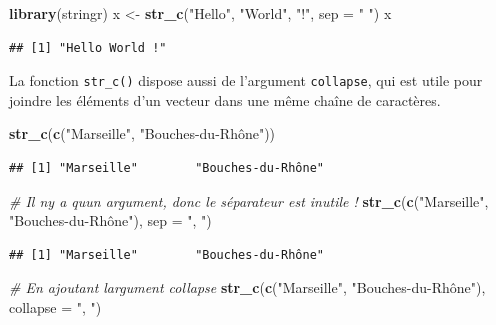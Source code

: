 \documentclass[
  11pt,
]{book}
\newenvironment{Shaded}{\begin{snugshade}}{\end{snugshade}}
\newcommand{\CommentTok}[1]{\textcolor[rgb]{0.56,0.35,0.01}{\textit{#1}}}
\newcommand{\DataTypeTok}[1]{\textcolor[rgb]{0.13,0.29,0.53}{#1}}
\newcommand{\KeywordTok}[1]{\textcolor[rgb]{0.13,0.29,0.53}{\textbf{#1}}}
\newcommand{\NormalTok}[1]{#1}
\newcommand{\StringTok}[1]{\textcolor[rgb]{0.31,0.60,0.02}{#1}}
\numberwithin{equation}{section}
\numberwithin{countremarque}{section}
\begin{document}
\begin{Shaded}
\begin{Highlighting}[]
\KeywordTok{library}\NormalTok{(stringr)}
\NormalTok{x \textless{}{-}}\StringTok{ }\KeywordTok{str\_c}\NormalTok{(}\StringTok{"Hello"}\NormalTok{, }\StringTok{"World"}\NormalTok{, }\StringTok{"!"}\NormalTok{, }\DataTypeTok{sep =} \StringTok{" "}\NormalTok{)}
\NormalTok{x}
\end{Highlighting}
\end{Shaded}

\begin{lstlisting}
## [1] "Hello World !"
\end{lstlisting}

La fonction \texttt{str\_c()} dispose aussi de l'argument \texttt{collapse}, qui est utile pour joindre les éléments d'un vecteur dans une même chaîne de caractères.

\begin{Shaded}
\begin{Highlighting}[]
\KeywordTok{str\_c}\NormalTok{(}\KeywordTok{c}\NormalTok{(}\StringTok{"Marseille"}\NormalTok{, }\StringTok{"Bouches{-}du{-}Rhône"}\NormalTok{))}
\end{Highlighting}
\end{Shaded}

\begin{lstlisting}
## [1] "Marseille"        "Bouches-du-Rhône"
\end{lstlisting}

\begin{Shaded}
\begin{Highlighting}[]
\CommentTok{\# Il n\textquotesingle{}y a qu\textquotesingle{}un argument, donc le séparateur est inutile !}
\KeywordTok{str\_c}\NormalTok{(}\KeywordTok{c}\NormalTok{(}\StringTok{"Marseille"}\NormalTok{, }\StringTok{"Bouches{-}du{-}Rhône"}\NormalTok{), }\DataTypeTok{sep =} \StringTok{", "}\NormalTok{)}
\end{Highlighting}
\end{Shaded}

\begin{lstlisting}
## [1] "Marseille"        "Bouches-du-Rhône"
\end{lstlisting}

\begin{Shaded}
\begin{Highlighting}[]
\CommentTok{\# En ajoutant l\textquotesingle{}argument collapse}
\KeywordTok{str\_c}\NormalTok{(}\KeywordTok{c}\NormalTok{(}\StringTok{"Marseille"}\NormalTok{, }\StringTok{"Bouches{-}du{-}Rhône"}\NormalTok{), }\DataTypeTok{collapse =} \StringTok{", "}\NormalTok{)}
\end{Highlighting}
\end{Shaded}
\end{document}
